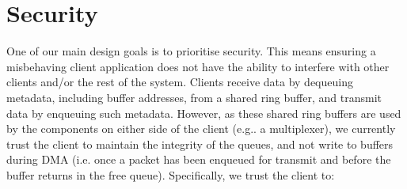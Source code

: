 \section{Security}
One of our main design goals is to prioritise security. This means ensuring a 
misbehaving client application does not have the ability to interfere with other clients and/or the rest of the system. Clients receive
data by dequeuing metadata, including buffer addresses, from a shared ring buffer, and transmit data by enqueuing such metadata. 
However, as these shared ring buffers are used by the components on either side of the client (e.g.. a multiplexer), we currently 
trust the client to maintain the integrity of the queues, and not write to buffers during DMA (i.e. once a packet has been enqueued
for transmit and before the buffer returns in the free queue). Specifically, we trust the client to:
